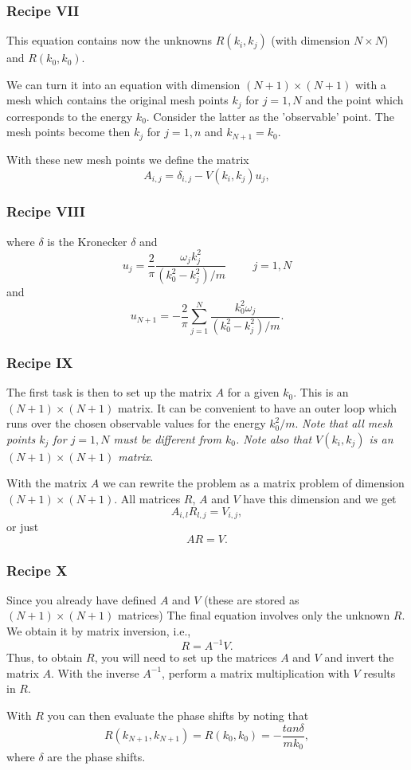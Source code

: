 \documentclass[compress]{beamer}
\begin{document}
\frame
{
\frametitle{Recipe VII}
\begin{small}
{\scriptsize

This equation contains now the unknowns $R(k_i,k_j)$
(with dimension $N\times N$) and $R(k_0,k_0)$.

We can turn it into an equation
with dimension $(N+1)\times (N+1)$ with  a mesh
which contains the original mesh points $k_j$ for $j=1,N$
and the point which corresponds to the energy $k_0$.
Consider the latter as the 'observable' point.
The mesh points become then $k_j$ for $j=1,n$ and
$k_{N+1}=k_0$. 

With these new mesh points we define the matrix
\[
      A_{i,j}=\delta_{i,j}-V(k_i,k_j)u_j,
      \label{eq:aeq}
\]
}
\end{small}

}



\frame
{
\frametitle{Recipe VIII}
\begin{small}
{\scriptsize

where $\delta$ is the Kronecker $\delta$
and
\[
     u_j=\frac{2}{\pi}
         \frac{\omega_jk_j^2}{(k_0^2-k_j^2)/m}\hspace{1cm}
         j=1,N
\]
and
\[
     u_{N+1}=-\frac{2}{\pi}
          \sum_{j=1}^N\frac{k_0^2\omega_j}{(k_0^2-k_j^2)/m}.
\]
}
\end{small}

}


\frame
{
\frametitle{Recipe IX}
\begin{small}
{\scriptsize

The first task is then to 
set up the matrix $A$ for a given $k_0$. This is an
$(N+1)\times (N+1)$ matrix. It can be convenient
to have an outer loop which runs over the chosen
observable values for the energy $k_0^2/m$.
{\em Note that all mesh points $k_j$ for $j=1,N$ must be
different from $k_0$. Note also that
$V(k_i,k_j)$ is an
$(N+1)\times (N+1)$ matrix}. 

  With the matrix $A$ we can rewrite the problem
  as a matrix problem of dimension $(N+1)\times (N+1)$.
  All matrices $R$, $A$ and $V$ have this dimension
  and we get
\[
    A_{i,l}R_{l,j}=V_{i,j},
\] 
or just
\[
    AR=V.
\] 
}
\end{small}

}


\frame
{
\frametitle{Recipe X}
\begin{small}
{\scriptsize

Since you already have defined $A$ and $V$
(these are stored as $(N+1)\times (N+1)$ matrices) 
The final equation involves only the unknown
$R$. We obtain it by matrix inversion, i.e.,
\[
    R=A^{-1}V.
    \label{eq:final2}
\] 
Thus, to obtain $R$, you will need to set up the matrices
$A$ and $V$ and invert the matrix $A$. 
With the inverse $A^{-1}$, perform
a matrix multiplication with $V$ results in $R$.


With $R$ you can then evaluate the phase shifts
by noting that 
\[
      R(k_{N+1},k_{N+1})=R(k_0,k_0)=-\frac{tan\delta}{mk_0},
\]
where $\delta$ are the phase shifts.
}
\end{small}

}
\end{document}
